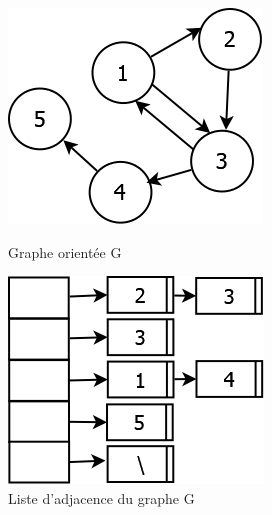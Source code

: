 \begin{figure}[H]
	\begin{minipage}[c]{.46\linewidth}
	\begin{center}
		\includegraphics[height=100 pt, width=110 pt]{./ressources/image/graphAdjace.png} 
		\caption{Graphe orientée G}
		\label{grapAdjac2}
	\end{center}
	\end{minipage} 
	\begin{minipage}[c]{.46\linewidth}
	\begin{center}
		\includegraphics[height=110 pt, width=140 pt]{./ressources/image/listeAdjace.png} 
		\caption{Liste d'adjacence du graphe G}
		\label{listeAdjac}
	\end{center}
	\end{minipage} 
\end{figure}
	